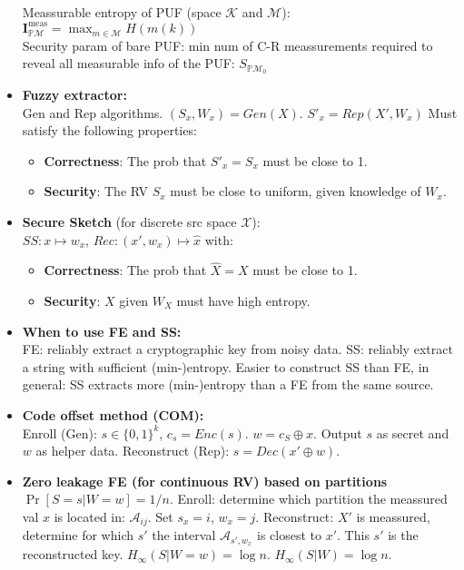 \documentclass[twocolumn,9pt]{extarticle}
\begin{document}
\begin{itemize}
	Meassurable entropy of PUF (space $\mathcal{K}$ and $\mathcal{M}$):\\
	$\mathbf{I}^\text{meas}_{\mathbb{P}\mathcal{M}} = \max_{m\in\mathcal{M}} H(m(k))$\\

	Security param of bare PUF: min num of C-R meassurements required to reveal all measurable info of the PUF: $S_{\mathbb{P}\mathcal{M}_0}$

	\item \textbf{Fuzzy extractor: } \\
	Gen and Rep algorithms. $(S_x,W_x) = Gen(X)$. $S'_x = Rep(X', W_x)$
	Must satisfy the following properties:
	\begin{itemize}
		\item \textbf{Correctness}: The prob that $S'_x = S_x$ must be close to 1.
		\item \textbf{Security}: The RV $S_x$ must be close to uniform, given knowledge of $W_x$.
	\end{itemize}

	\item \textbf{Secure Sketch} (for discrete src space $\mathcal{X}$):\\
	$SS: x \mapsto w_x$, $Rec: (x', w_x) \mapsto \hat{x}$ with:
	\begin{itemize}
		\item \textbf{Correctness}: The prob that $\hat{X} = X$ must be close to 1.
		\item \textbf{Security}: $X$ given $W_X$ must have high entropy.
	\end{itemize}

	\item \textbf{When to use FE and SS: } \\
	FE: reliably extract a cryptographic key from noisy data. SS: reliably extract a string with sufficient (min-)entropy. Easier to construct SS than FE, in general: SS extracts more (min-)entropy than a FE from the same source.

	\item \textbf{Code offset method (COM):} \\
	Enroll (Gen): $s \in \{0,1\}^k$, $c_s = Enc(s)$. $w = c_S \oplus x$. Output $s$ as secret and $w$ as helper data.
	Reconstruct (Rep): $\hat{s} = Dec(x' \oplus w)$.


	\item \textbf{Zero leakage FE (for continuous RV) based on partitions } \\
	$\Pr[S=s|W=w] = 1/n$. Enroll: determine which partition the meassured val $x$ is located in: $\mathcal{A}_{ij}$. Set $s_x = i$, $w_x = j$. Reconstruct: $X'$ is meassured, determine for which $s'$ the interval $\mathcal{A}_{s',w_x}$ is closest to $x'$. This $s'$ is the reconstructed key. $H_\infty(S|W=w) = \log n$. $H_\infty(S|W) = \log n$.


\end{itemize}
\end{document}
